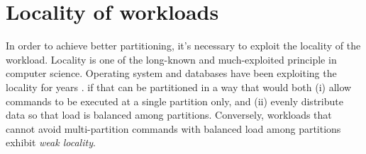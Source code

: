 \section{Locality of workloads}
\label{sysmodel:locality}
In order to achieve better partitioning, it's necessary to exploit the locality
of the workload. Locality is one of the long-known and much-exploited principle in
computer science. Operating system and databases have been exploiting the
locality for years \cite{denning2006locality}.  if that can be partitioned in a way that would both (i) allow commands
to be executed at a single partition only, and (ii) evenly distribute data so
that load is balanced among partitions. Conversely, workloads that cannot avoid
multi-partition commands with balanced load among partitions exhibit \emph{weak
locality}.
